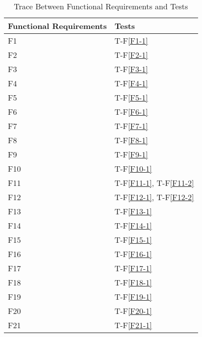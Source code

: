 \documentclass[12pt, titlepage]{article}
\newcommand{\fref}[1]{T-F\ref{#1}}
\begin{document}
\begin{table}[H]
\centering
\begin{tabular}{p{} p{}}
\toprule
\textbf{Functional Requirements} & \textbf{Tests}\\
\midrule
F1 & \fref{F1-1}\\
F2 & \fref{F2-1}\\
F3 & \fref{F3-1}\\
F4 & \fref{F4-1}\\
F5 & \fref{F5-1}\\
F6 & \fref{F6-1}\\
F7 & \fref{F7-1}\\
F8 & \fref{F8-1}\\
F9 & \fref{F9-1}\\
F10 & \fref{F10-1}\\
F11 & \fref{F11-1}, \fref{F11-2}\\
F12 & \fref{F12-1}, \fref{F12-2}\\
F13 & \fref{F13-1}\\
F14 & \fref{F14-1} \\
F15 & \fref{F15-1} \\
F16 & \fref{F16-1} \\
F17 & \fref{F17-1} \\
F18 & \fref{F18-1} \\
F19 & \fref{F19-1} \\
F20 & \fref{F20-1} \\
F21 & \fref{F21-1} \\
\bottomrule
\end{tabular}
\caption{Trace Between Functional Requirements and Tests}
\label{TblRT}
\end{table}
\end{document}
